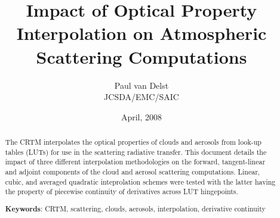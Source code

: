 




\newcommand{\rb}[1]{\raisebox{1.5ex}[0pt]{#1}}
\newcommand{\po}{\ensuremath{p_{0}}}
\newcommand{\bpo}{\boldmath\po\unboldmath}
\newcommand{\Dp}{\ensuremath{\Delta p}}
\newcommand{\bDp}{\boldmath\Dp\unboldmath}
\newcommand{\reff}{\ensuremath{R_{eff}}}
\newcommand{\breff}{\boldmath\reff\unboldmath}
\newcommand{\bhpa}{\textbf{(hPa)}}
\newcommand{\bmicron}{\boldmath\micron\unboldmath}

\title{Impact of Optical Property Interpolation on Atmospheric Scattering Computations}
\author{Paul van Delst\\JCSDA/EMC/SAIC}
\date{April, 2008}



\maketitle

\draftwatermark

\begin{abstract}
The CRTM interpolates the optical properties of clouds and aerosols from look-up tables (LUTs) for use in the scattering radiative transfer. This document details the impact of three different interpolation methodologies on the forward, tangent-linear and adjoint components of the cloud and aerosol scattering computations. Linear, cubic, and averaged quadratic inteprolation schemes were tested with the latter having the property of piecewise continuity of derivatives across LUT hingepoints.

\textbf{Keywords}: CRTM, scattering, clouds, aerosols, interpolation, derivative continuity
\end{abstract}


